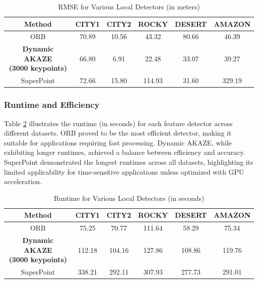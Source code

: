 \begin{table}[H]
    \centering
    \caption{RMSE for Various Local Detectors (in meters)}
    \label{tab:rmse_detectors}
    \begin{tabular}{|c|c|c|c|c|c|}
    \hline
    \textbf{Method} & \textbf{CITY1} & \textbf{CITY2} & \textbf{ROCKY} & \textbf{DESERT} & \textbf{AMAZON} \\ \hline
    ORB & 70.89 & 10.56 & 43.32 & 80.66 & 46.39 \\ \hline
    \makecell{\textbf{Dynamic AKAZE} \\ \textbf{(3000 keypoints)}} & 66.80 & 6.91 & 22.48 & 33.07 & 39.27 \\ \hline
    SuperPoint & 72.66 & 15.80 & 114.93 & 31.60 & 329.19 \\ \hline
    \end{tabular}
\end{table}

\subsubsection{Runtime and Efficiency}

Table \ref{tab:runtime_detectors} illustrates the runtime (in seconds) for each feature detector across different datasets. ORB proved to be the most efficient detector, making it suitable for applications requiring fast processing. Dynamic AKAZE, while exhibiting longer runtimes, achieved a balance between efficiency and accuracy. SuperPoint demonstrated the longest runtimes across all datasets, highlighting its limited applicability for time-sensitive applications unless optimized with GPU acceleration.

\begin{table}[H]
    \centering
    \caption{Runtime for Various Local Detectors (in seconds)}
    \label{tab:runtime_detectors}
    \begin{tabular}{|c|c|c|c|c|c|}
    \hline
    \textbf{Method} & \textbf{CITY1} & \textbf{CITY2} & \textbf{ROCKY} & \textbf{DESERT} & \textbf{AMAZON} \\ \hline
    ORB & 75.25 & 70.77 & 111.64 & 58.29 & 75.34 \\ \hline
    \makecell{\textbf{Dynamic AKAZE} \\ \textbf{(3000 keypoints)}} & 112.18 & 104.16 & 127.86 & 108.86 & 119.76 \\ \hline
    SuperPoint & 338.21 & 292.11 & 307.93 & 277.73 & 291.01 \\ \hline
    \end{tabular}
\end{table}

